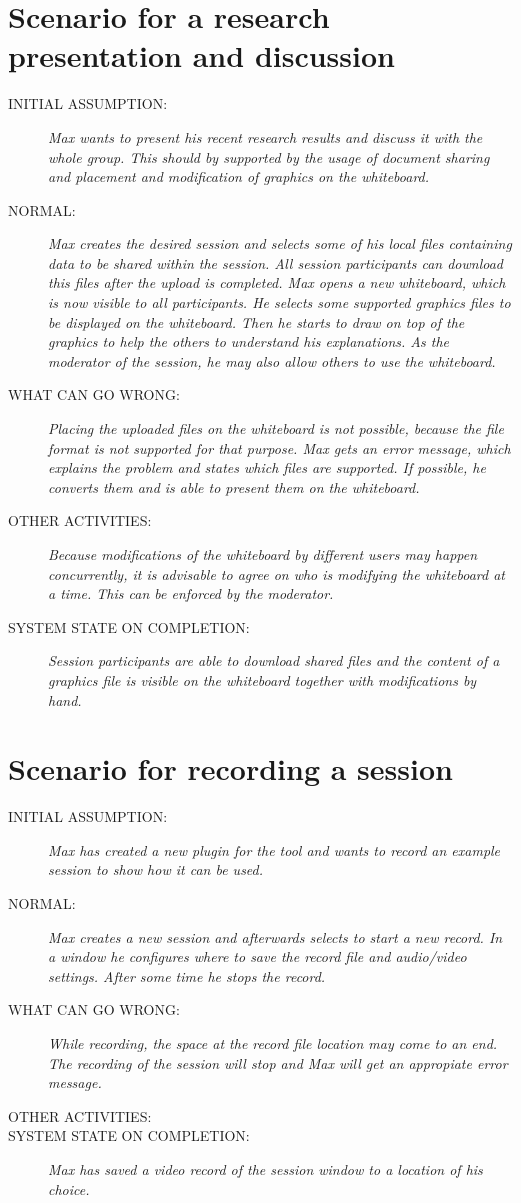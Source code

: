 \section{Scenario for a research presentation and discussion}
\begin{description}
\item[INITIAL ASSUMPTION:]
\textit{Max wants to present his recent research results and discuss it with the
whole group. This should by supported by the usage of document sharing and placement 
and modification of graphics on the whiteboard.}
\item[NORMAL:]
\textit{Max creates the desired session and selects some of his local files
containing data to be shared within the session. All session participants can download this
files after the upload is completed. Max opens a new whiteboard, which is
now visible to all participants. He selects some supported graphics files to be 
displayed on the whiteboard. Then he starts to draw on top of the graphics to
help the others to understand his explanations. As the moderator of the
session, he may also allow others to use the whiteboard.}
\item[WHAT CAN GO WRONG:]
\textit{Placing the uploaded files on the whiteboard is not possible, because the
file format is not supported for that purpose. Max gets an error message, which
explains the problem and states which files are supported. If possible, he
converts them and is able to present them on the whiteboard.}
\item[OTHER ACTIVITIES:]
\textit{Because modifications of the whiteboard by different users may happen
concurrently, it is advisable to agree on who is modifying the whiteboard
at a time. This can be enforced by the moderator.}
\item[SYSTEM STATE ON COMPLETION:]
\textit{Session participants are able to download shared files and
the content of a graphics file is visible on the whiteboard together with
modifications by hand.}
\end{description}


\section{Scenario for recording a session}
\begin{description}
\item[INITIAL ASSUMPTION:]
\textit{Max has created a new plugin for the tool and wants to record an example
session to show how it can be used.}
\item[NORMAL:]
\textit{Max creates a new session and afterwards selects to start a new record.
In a window he configures where to save the record file and audio/video
settings. After some time he stops the record.}
\item[WHAT CAN GO WRONG:]
\textit{While recording, the space at the record file location may come to an
end. The recording of the session will stop and Max will get an appropiate error
message.}
\item[OTHER ACTIVITIES:]
\item[SYSTEM STATE ON COMPLETION:]
\textit{Max has saved a video record of the session window to a location of
his choice.}
\end{description}